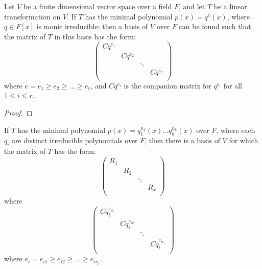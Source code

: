 \begin{theorem}\label{3.3.23}
    Let $V$ be a finite dimensional vector space over a field  $F$, and let
    $T$ be a linear transformation on  $V$. If  $T$ has the minimal polynomial
     $p(x)=q^e(x)$, where $q \in F[x]$ is monic irreducible; then a basis of
     $V$ over  $F$ can be found such that the matrix of  $T$ in this basis has
     the form:
        \begin{equation}
            \begin{pmatrix}
                Cq^{e_1} &  &    &    \\
                    &   Cq^{e_2} &    \\
                    &   &   \ddots  &   \\
                    &   &   &   Cq^{e_r} \\
            \end{pmatrix}
        \end{equation}
    where $e=e_1 \geq e_2 \geq \dots \geq e_r$, and $Cq^{e_i}$ is the companion
    matrix for $q^{e_i}$ for all $1 \leq i \leq r$.
\end{theorem}
\begin{proof}
\end{proof}
\begin{corollary}
    If $T$ has the minimal polynomial  $p(x)=q_1^{n_1}(x) \dots q_k^{n_k}(x)$
    over $F$, where each  $q_i$ are distinct irreducible polynomials over  $F$,
    then there is a basis of  $V$ for which the matrix of  $T$ has the form:
        \begin{equation}
            \begin{pmatrix}
                R_1 &  &    &    \\
                    &   R_2 &    \\
                    &   &   \ddots  &   \\
                    &   &   &   R_k \\
            \end{pmatrix}
        \end{equation}
    where
        \begin{equation}
            \begin{pmatrix}
                Cq_i^{e_{i1}} &  &    &    \\
                    &   Cq_i^{e_{i2}} &    \\
                    &   &   \ddots  &   \\
                    &   &   &   Cq_i^{e_{ir_i}} \\
            \end{pmatrix}
        \end{equation}
    where $e_i=e_{i1} \geq e_{i2} \geq \dots \geq e_{ir_i}$.
\end{corollary}

